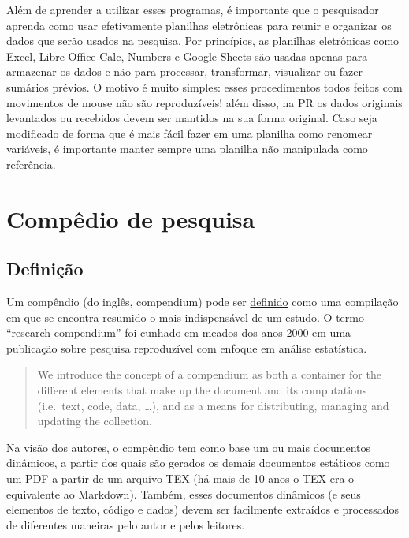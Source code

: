 \documentclass[]{book}
\begin{document}
Além de aprender a utilizar esses programas, é importante que o
pesquisador aprenda como usar efetivamente planilhas eletrônicas para
reunir e organizar os dados que serão usados na pesquisa. Por
princípios, as planilhas eletrônicas como Excel, Libre Office Calc,
Numbers e Google Sheets são usadas apenas para armazenar os dados e não
para processar, transformar, visualizar ou fazer sumários prévios. O
motivo é muito simples: esses procedimentos todos feitos com movimentos
de mouse não são reproduzíveis! além disso, na PR os dados originais
levantados ou recebidos devem ser mantidos na sua forma original. Caso
seja modificado de forma que é mais fácil fazer em uma planilha como
renomear variáveis, é importante manter sempre uma planilha não
manipulada como referência.

\hypertarget{compedio-de-pesquisa}{%
\chapter{Compêdio de pesquisa}\label{compedio-de-pesquisa}}

\hypertarget{definicao}{%
\section{Definição}\label{definicao}}

Um compêndio (do inglês, compendium) pode ser
\href{https://www.priberam.pt/dlpo/compêndio}{definido} como uma
compilação em que se encontra resumido o mais indispensável de um
estudo. O termo ``research compendium'' foi cunhado em meados dos anos
2000 em uma publicação sobre pesquisa reproduzível com enfoque em
análise estatística.

\begin{quote}
We introduce the concept of a compendium as both a container for the
different elements that make up the document and its computations
(i.e.~text, code, data, \ldots{}), and as a means for distributing,
managing and updating the
collection.\citep{Robert_Gentleman_Department_of_Biostatistics_Harvard_University2004-qt}
\end{quote}

Na visão dos autores, o compêndio tem como base um ou mais documentos
dinâmicos, a partir dos quais são gerados os demais documentos estáticos
como um PDF a partir de um arquivo TEX (há mais de 10 anos o TEX era o
equivalente ao Markdown). Também, esses documentos dinâmicos (e seus
elementos de texto, código e dados) devem ser facilmente extraídos e
processados de diferentes maneiras pelo autor e pelos leitores.
\end{document}
